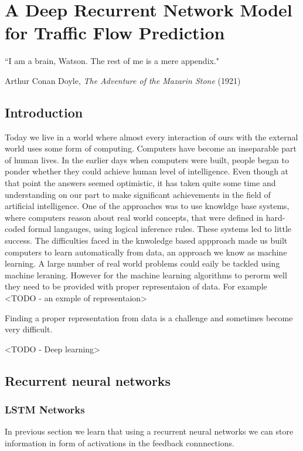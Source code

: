 
\chapter{A Deep Recurrent Network Model for Traffic Flow Prediction} %

\label{Chapter4} %


{``I am a brain, Watson. The rest of me is a mere appendix."}
\begin{flushright}
Arthur Conan Doyle, \textit{The Adventure of the Mazarin Stone} (1921)
\end{flushright}


\section{Introduction}
Today we live in a world where almost every interaction of ours with the external world uses some
form of computing. Computers have become an inseparable part of human lives. In the earlier days
when computers were built, people began to ponder whether they could achieve human level
of intelligence. Even though at that point the answers seemed optimistic, it has taken quite
some time and understanding on our part to make significant achievements in the field of
artificial intelligence. One of the approaches was to use knowldge base systems, where computers
reason about real world concepts, that were defined in hard-coded formal langauges, using logical
inference rules. These systems led to little success. The difficulties faced in the knwoledge
based appproach made us built computers to learn automatically from data, an approach we know as
machine learning. A large number of real world problems could eaily be tackled using machine
leraning. However for the machine learning algorithms to perorm well they need to be provided
with proper representaion of data. For example <TODO - an exmple of representaion>

Finding a proper representation from data is a challenge and sometimes become very difficult.

<TODO - Deep learning>

\section{Recurrent neural networks}

\subsection{LSTM Networks}
In previous section we learn that using a recurrent neural networks we can store information in
form of activations in the feedback connnections.

